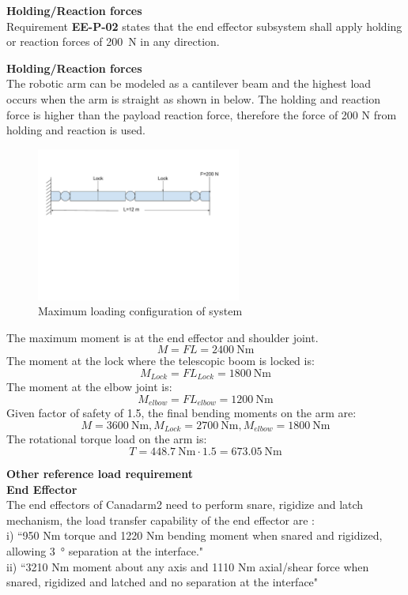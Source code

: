 \large \textbf{Holding/Reaction forces}\\
\normalsize Requirement \textbf{EE-P-02} states that the end effector subsystem shall apply holding or reaction forces of \SI{200}{\newton} in any direction.

\large \textbf{Holding/Reaction forces}\\
\normalsize The robotic arm can be modeled as a cantilever beam and the highest load occurs when the arm is straight as shown in  below. The holding and reaction force is higher than the payload reaction force, therefore the force of 200 \gls{N} from holding and reaction is used.

\begin{figure}[H]
\centering
\includegraphics[width=0.6\textwidth]{Apppic/loading}
\caption{Maximum loading configuration of system}
\label{fig:loading}
\end{figure}

The maximum moment is at the end effector and shoulder joint.
$$M=FL=\SI{2400}{\newton\metre}$$
The moment at the lock where the telescopic boom is locked is:
$$M_{Lock} = FL_{Lock} = \SI{1800}{\newton\metre}$$
The moment at the elbow joint is:
$$M_{elbow} = FL_{elbow} = \SI{1200}{\newton\metre}$$
Given factor of safety of 1.5, the final bending moments on the arm are:
$$M=\SI{3600}{\newton\metre}, M_{Lock}=\SI{2700}{\newton\metre}, M_{elbow}=\SI{1800}{\newton\metre}$$
The rotational torque load on the arm is:
$$T = \SI{448.7}{\newton\metre}\cdot1.5=\SI{673.05}{\newton\metre}$$

\large \textbf{Other reference load requirement}\\
\normalsize \textbf{End Effector}\\
The end effectors of Canadarm2 need to perform snare, rigidize and latch mechanism, the load transfer capability of the end effector are \cite{NASAsysreq_Kumar}:\\
i) ``950 \gls{Nm} torque and 1220 \gls{Nm} bending moment when snared and rigidized, allowing \SI{3}{\degree} separation at the interface."\\
ii) ``3210 \gls{Nm} moment about any axis and 1110 \gls{Nm} axial/shear force when snared, rigidized and latched and no separation at the interface"


